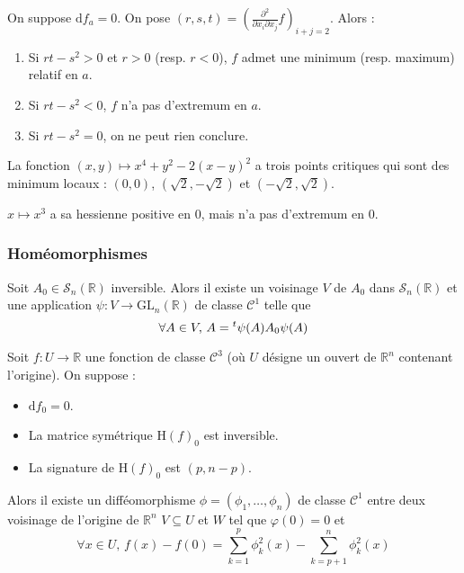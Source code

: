   \begin{example}
    On suppose $\mathrm{d}f_a = 0$. On pose $(r,s,t) = \left(  \frac{\partial^2}{\partial x_i \partial x_j} f \right)_{i+j=2}$. Alors :
    \begin{enumerate}[label=(\roman*)]
      \item Si $rt-s^2 > 0$ et $r > 0$ (resp. $r < 0$), $f$ admet une minimum (resp. maximum) relatif en $a$.
      \item Si $rt-s^2 < 0$, $f$ n'a pas d'extremum en $a$.
      \item Si $rt-s^2 = 0$, on ne peut rien conclure.
    \end{enumerate}
  \end{example}

  \begin{example}
    La fonction $(x,y) \mapsto x^4 + y^2 - 2(x-y)^2$ a trois points critiques qui sont des minimum locaux : $(0,0)$, $(\sqrt{2},-\sqrt{2})$ et $(-\sqrt{2},\sqrt{2})$.
  \end{example}

  \begin{cexample}
    $x \mapsto x^3$ a sa hessienne positive en $0$, mais n'a pas d'extremum en $0$.
  \end{cexample}

  \subsubsection{Homéomorphismes}


  \begin{lemma}
    Soit $A_0 \in \mathcal{S}_n(\mathbb{R})$ inversible. Alors il existe un voisinage $V$ de $A_0$ dans $\mathcal{S}_n(\mathbb{R})$ et une application $\psi : V \rightarrow \mathrm{GL}_n(\mathbb{R})$ de classe $\mathcal{C}^1$ telle que
    \[ \forall A \in V, \, A = \mathstrut ^t \psi(A) A_0 \psi(A) \]
  \end{lemma}


  \begin{lemma}[Morse]
    Soit $f : U \rightarrow \mathbb{R}$ une fonction de classe $\mathcal{C}^3$ (où $U$ désigne un ouvert de $\mathbb{R}^n$ contenant l'origine). On suppose :
    \begin{itemize}
      \item $\mathrm{d} f_0 = 0$.
      \item La matrice symétrique $\mathrm{H} (f)_0$ est inversible.
      \item La signature de $\mathrm{H}(f)_0$ est $(p, n-p)$.
    \end{itemize}
    Alors il existe un difféomorphisme $\phi = (\phi_1, \dots, \phi_n)$ de classe $\mathcal{C}^1$ entre deux voisinage de l'origine de $\mathbb{R}^n$ $V \subseteq U$ et $W$ tel que $\varphi(0) = 0$ et
    \[ \forall x \in U, \, f(x) - f(0) = \sum_{k=1}^p \phi_k^2(x) - \sum_{k=p+1}^n \phi_k^2(x) \]
  \end{lemma}

